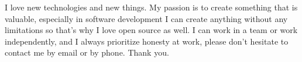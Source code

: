 \documentclass[10pt, a4paper]{awesome-cv}
\begin{document}
\begin{cvletter}
I love new technologies and new things. My passion is to create something that is valuable, especially in software development I can create anything without any limitations so that's why I love open source as well.
I can work in a team or work independently, and I always prioritize honesty at work, please don't hesitate to contact me by email or by phone. Thank you.
\end{cvletter}


\makeletterclosing
\end{document}
